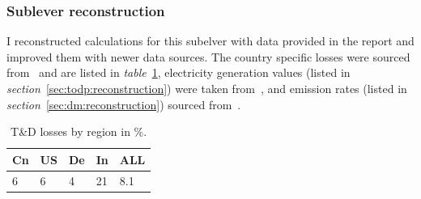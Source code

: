 \documentclass[11pt, twocolumn]{article}
\begin{document}
\subsubsection{Sublever reconstruction\label{sec:pgo:reconstruction}}
I reconstructed calculations for this subelver with data provided in the report and improved them with newer data sources. The country specific losses were sourced from~\citep{wb:2011:td} and are listed in \emph{table}~\ref{tab:td:bycountry}, electricity generation values (listed in \emph{section}~\ref{sec:todp:reconstruction}) were taken from~\citep{eia2011}, and emission rates (listed in \emph{section}~\ref{sec:dm:reconstruction}) sourced from~\citep{iea2012co2}.\\

\begin{center}
  \begin{table}[h]
    \begin{tabular}{ p{} | p{} | p{} | p{} | p{} }
      Cn & US & De & In & ALL \\
      \hline
      6 & 6 & 4 & 21 & 8.1
    \end{tabular}
    \caption{T\&D losses by region in \%. \label{tab:td:bycountry}}
  \end{table}
\end{center}
\end{document}
